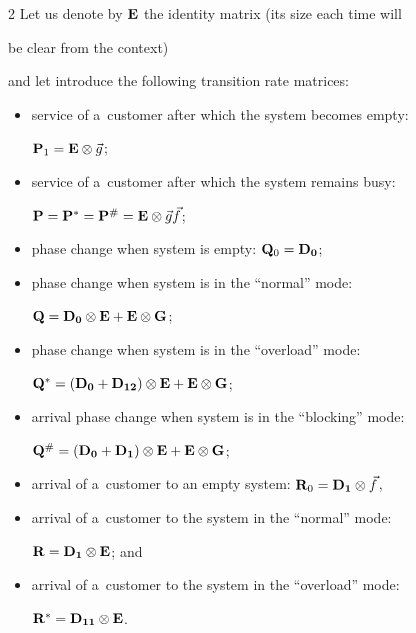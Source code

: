 \begin{multicols}{2}
Let us denote by $\mathbf{E}$ the identity matrix (its size each time will 


be clear from the context)


and let introduce the following transition rate matrices:


\begin{itemize}


    \item service of a~customer after which the system becomes empty: 


    $\mathbf{P}_1=\mathbf{E}\otimes {\vec g}$;


    \item service of a~customer after which the system remains busy: 


    $\mathbf{P}=\mathbf{P}^*=\mathbf{P}^{\#}=\mathbf{E}\otimes {\vec g}{\vec f}$;


    \item phase change when system is empty: $\mathbf{Q}_0=\mathbf{D_0}$;


    \item phase change when system is in the ``normal'' mode: 


    $\mathbf{Q}=\mathbf{D_0}\otimes \mathbf{E} + \mathbf{E} \otimes \mathbf{G}$;


    \item phase change when system is in the ``overload'' mode: 


    $\mathbf{Q}^*=(\mathbf{D_0}+\mathbf{D_{12}})\otimes \mathbf{E} + \mathbf{E} \otimes \mathbf{G}$;


        \item arrival phase change when system is in the ``blocking'' mode: 


        $\bmx{Q}^{\#}=(\bmx{D_0}+\bmx{D_{1}})\otimes \bmx{E} + \bmx{E} \otimes 


        \bmx{G}$;


    \item arrival of a~customer to an empty system: $\bmx{R}_0\linebreak =\bmx{D_1} \otimes


    {\vec f}$,


    \item arrival of a~customer to the system in the ``normal'' mode: 


    $\mathbf{R}=\mathbf{D_1}\otimes \mathbf{E}$; and


    \item arrival of a~customer to the system in the ``overload'' mode: 


    $\mathbf{R}^*=\mathbf{D_{11}}\otimes \mathbf{E}$.



\end{itemize}
\end{multicols}
